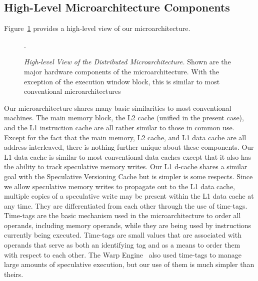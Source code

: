 \documentclass[10pt,dvips]{article}
\begin{document}
\subsection{High-Level Microarchitecture Components}
%
Figure~\ref{fig:high} provides a high-level view of our microarchitecture.
%
\begin{figure}
\centering
{}
\caption{{\em High-level View of the Distributed Microarchitecture.} 
Shown are the major hardware components of the microarchitecture.
With the exception of the 
execution window block, this is similar to most conventional
microarchitectures}.
\label{fig:high}
\end{figure}
%
Our microarchitecture shares many basic 
similarities to most conventional
machines.
The main memory block,
the L2 cache (unified in the present case), and the L1 instruction 
cache are all rather similar to those in common use.
Except for the fact that the main memory, L2 cache, and L1 data
cache are all address-interleaved, there is nothing further
unique about these components. 
Our L1 data cache is similar to
most conventional data caches except that it also has the ability to
track speculative memory writes.
Our L1 d-cache shares a similar goal with the 
Speculative Versioning Cache \cite{Gop98} 
but is simpler is some respects.
Since we allow speculative memory writes to propagate
out to the L1 data cache, multiple copies
of a speculative write may be present within the L1 data cache
at any time.  They are differentiated from each other
through the use of time-tags.  Time-tags are the basic mechanism
used in the microarchitecture to order all operands, including
memory operands, while they are being used by instructions
currently being executed.  Time-tags are small values that
are associated with operands that serve as both an identifying
tag and as a means to order them with respect to each other.
The Warp Engine~\cite{Cle95}
also used time-tags to manage large amounts of speculative execution,
but our use of them is much simpler than theirs.
\end{document}
